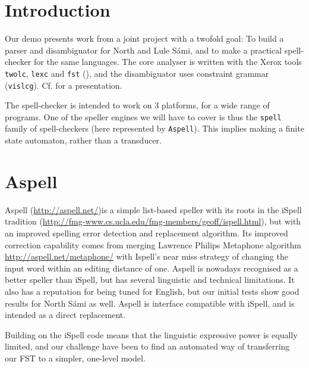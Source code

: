 
\section{Introduction}

Our demo presents work from a joint project with a twofold goal: To build a parser and disambiguator for North and Lule S\'{a}mi, and to make a practical spell-checker for the same languages. The core analyser is written with the Xerox tools \texttt{twolc}, \texttt{lexc} and \texttt{fst} (\cite{Beesley03}), and the disambiguator uses constraint grammar (\texttt{vislcg}). Cf. \cite{Trosterud03} for a presentation.

The spell-checker is intended to work on 3 platforms, for a wide range of programs. One of the speller engines we will have to cover is thus the \texttt{spell} family of spell-checkers (here represented by \texttt{Aspell}). This implies making a finite state automaton, rather than a transducer.

\section{Aspell}

Aspell (\url{http://aspell.net/})is a simple list-based speller with its roots in the iSpell tradition (\url{http://fmg-www.cs.ucla.edu/fmg-members/geoff/ispell.html}), but with an improved spelling error detection and replacement algorithm. Its improved correction capability comes from merging Lawrence Philips Metaphone algorithm \url{http://aspell.net/metaphone/} with Ispell's near miss strategy of changing the input word within an editing distance of one. Aspell is nowadays recognised as a better speller than iSpell, but has several linguistic and technical limitations. It also has a reputation for being tuned for English, but our initial tests show good results for North S\'{a}mi as well. Aspell is interface compatible with iSpell, and is intended as a direct replacement.



Building on the iSpell code means that the linguistic expressive power is equally limited, and our challenge have been to find an automated way of transferring our FST to a simpler, one-level model.


